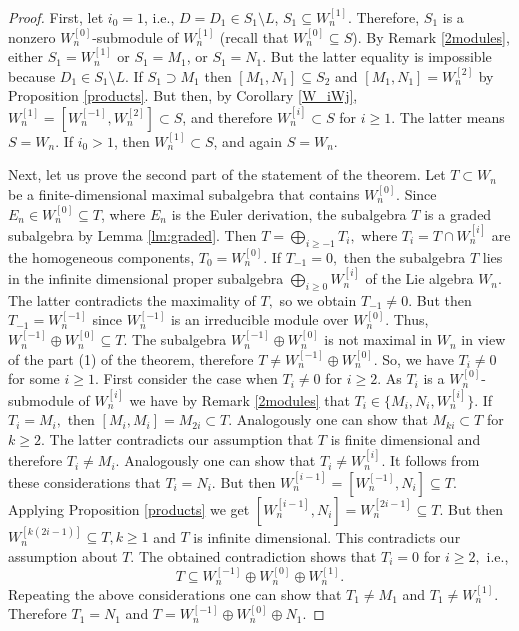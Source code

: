 \documentclass[12pt,a4paper]{amsart}
\theoremstyle{plain}
\theoremstyle{definition}
\begin{document}
{\begin{proof}
		First, let $i_0 = 1$, i.e., $D = D_1 \in S_1 \setminus L$, $S_1 \subseteq W_n^{[1]}$. Therefore, $S_1$ is a nonzero $W_n^{[0]}$-submodule of $W_n^{[1]}$ (recall that $W_n^{[0]} \subseteq S$).
		By Remark \ref{2modules}, either $S_1=W_n^{[1]}$ or $S_1 = M_1$, or $S_1 = N_1$. But the latter equality is impossible because $D_1 \in S_1 \setminus L$. If $S_1 \supset M_1$ then $[M_1, N_1] \subseteq S_2$ and $[M_1, N_1] = W_n^{[2]}$ by Proposition \ref{products}. But then, by Corollary \ref{W_iWj}, 
		$W_n^{[1]} = [W_n^{[-1]}, W_n^{[2]}] \subset S$, and therefore 
		$W_n^{[i]} \subset S$ for $i \ge 1$. The latter means $S = W_n$.
		If $i_0 > 1$, then $W_n^{[1]} \subset S$, and again
		$S = W_n$.
		
		Next, let us prove the second part of the statement of the theorem.
		Let $T \subset W_n$ be a finite-dimensional maximal subalgebra  that contains $W_n^{[0]}$. Since  $E_n\in W_n^{[0]}\subseteq T$, where $E_n$ is the Euler derivation, the subalgebra $T$ is a graded subalgebra by Lemma \ref{lm:graded}. Then  $T=\bigoplus_{i \ge -1}T_i,$ 		where $T_i=T\cap  W_n^{[i]}$ are the homogeneous components, $T_0 = W_n^{[0]}.$  If $T_{-1}=0,$ then the subalgebra $T$ lies in the infinite dimensional proper subalgebra $\bigoplus_{i \ge 0}W_n^{[i]}$ of the Lie algebra $W_n.$ The latter contradicts the maximality of $T,$ so we obtain $T_{-1}\not =0.$ But then $T_{-1}=W_n^{[-1]}$ since $W_n^{[-1]} $ is an irreducible module over $W_n^{[0]}.$ Thus, $W_n^{[-1]}\oplus W_n^{[0]}\subseteq T.$ The subalgebra $W_n^{[-1]}\oplus W_n^{[0]}$ is not maximal in $W_n$ in view of the part (1) of the theorem, therefore $T\not =W_n^{[-1]}\oplus W_n^{[0]}$. So, we have  $T_i\not =0$ for some $i\geq 1.$ First consider the case when $T_i\not =0$ for $i\geq 2.$ 
		As $T_i$ is a $	W_n^{[0]}$-submodule of $W_n^{[i]}$ we have by Remark \ref{2modules} that $T_i\in \{ M_i, N_i, W_n^{[i]}\} .$	 If $T_i=M_i,$ then $[M_i, M_i]=M_{2i} \subset  T.$ Analogously one can show that $M_{ki}\subset T$ for $k\geq 2. $ The latter contradicts our assumption that  $T$ is finite dimensional and therefore $T_i\not =M_i.$ Analogously one can show that $T_i\not = W_n^{[i]}.$ It follows from these considerations that $T_i=N_i.$ But then $W_n^{[i-1]}=[W_n^{[-1]}, N_i]\subseteq T.$ Applying  Proposition \ref{products} we get $[W_n^{[i-1]}, N_i]=W_n^{[2i-1]}\subseteq T.$ But then $W_n^{[k(2i-1)]}\subseteq T, k\geq 1 $ and $T$ is infinite dimensional. This contradicts our assumption about $T.$ The obtained contradiction shows that $T_i=0$ for $i\geq 2,$ i.e., $$T\subseteq W_n^{[-1]} \oplus W_n^{[0]} \oplus W_n^{[1]}.$$
		Repeating the above considerations one can show that $T_1\not =M_1$ and $T_1\not =W_n^{[1]}. $ Therefore $T_1=N_1$ and $T=W_n^{[-1]} \oplus W_n^{[0]} \oplus N_1.$
	\end{proof}
	
}
\end{document}

